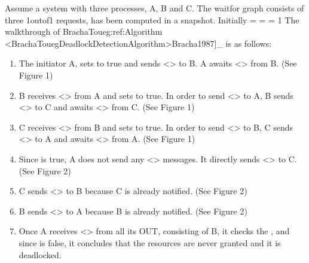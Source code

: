 \documentclass[letterpaper,10pt,english]{sphinxmanual}
\begin{document}
\sphinxAtStartPar
Assume a system with three processes, A, B and C. The wait\sphinxhyphen{}for graph consists of three 1\sphinxhyphen{}out\sphinxhyphen{}of\sphinxhyphen{}1 requests, has been computed in a snapshot. Initially  =  =  = 1
The walkthrough of Bracha\sphinxhyphen{}Toueg:ref:{\color{red}\bfseries{}\textasciigrave{}}Algorithm \textless{}BrachaTouegDeadlockDetectionAlgorithm\textgreater{}\textasciigrave{}{[}Bracha1987{]}\_ is as follows:
\begin{enumerate}
%
\item {} 
\sphinxAtStartPar
The initiator A, sets  to true and sends \textless{}\textgreater{} to B. A awaits \textless{}\textgreater{} from B. (See Figure 1)

\item {} 
\sphinxAtStartPar
B receives \textless{}\textgreater{} from A and sets  to true. In order to send \textless{}\textgreater{} to A, B sends \textless{}\textgreater{} to C and awaits \textless{}\textgreater{} from C. (See Figure 1)

\item {} 
\sphinxAtStartPar
C receives \textless{}\textgreater{} from B and sets  to true. In order to send \textless{}\textgreater{} to B, C sends \textless{}\textgreater{} to A and awaits \textless{}\textgreater{} from A. (See Figure 1)

\item {} 
\sphinxAtStartPar
Since  is true, A does not send any \textless{}\textgreater{} messages. It directly sends \textless{}\textgreater{} to C. (See Figure 2)

\item {} 
\sphinxAtStartPar
C sends \textless{}\textgreater{} to B because C is already notified. (See Figure 2)

\item {} 
\sphinxAtStartPar
B sends \textless{}\textgreater{} to A because B is already notified. (See Figure 2)

\item {} 
\sphinxAtStartPar
Once A receives \textless{}\textgreater{} from all its OUT, consisting of B, it checks the , and since  is false, it concludes that the resources are never granted and it is deadlocked.

\end{enumerate}
\end{document}
